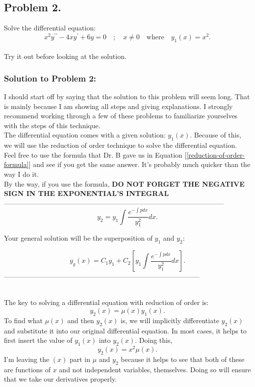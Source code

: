 \documentclass[a4paper,12pt]{article}
\begin{document}
\pagebreak

\subsection*{Problem 2.} Solve the differential equation:
$$ x^2 y^{\prime \prime}-4 x y^{\prime}+6 y=0 \quad ; \quad x\neq0 \quad \text{where} \quad y_1(x) = x^2.$$
\\
 
Try it out before looking at the solution.
\pagebreak
 
 \subsubsection*{Solution to Problem 2:}
 I should start off by saying that the solution to this problem will seem long. That is mainly because I am showing all steps and giving explanations. I strongly recommend working through a few of these problems to familiarize yourselves with the steps of this technique.\\
 
 The differential equation comes with a given solution: $y_1(x).$ Because of this, we will use the reduction of order technique to solve the differential equation.\\
 
 Feel free to use the formula that Dr. B gave us in Equation [\ref{reduction-of-order-formula}] and see if you get the same answer. It's probably much quicker than the way I do it.\\
 
 By the way, if you use the formula, \textbf{DO NOT FORGET THE NEGATIVE SIGN IN THE EXPONENTIAL'S INTEGRAL}\\
 
 ------------------------------------------------------------------------------------------------
$$
 	y_2 = y_1\int{\frac{e^{-\int pdx}}{y_1^2}}dx.
$$
 
 Your general solution will be the superposition of $y_1$ and $y_2$:
 
 \begin{equation}
 	y_g(x) = C_1y_1 + C_2\left[y_1\int{\frac{e^{-\int pdx}}{y_1^2}}dx\right].\label{reduction-of-order-formula}
 \end{equation}
 --------------------------------------------------------------------------------------\\
 \
 
 The key to solving a differential equation with reduction of order is:
 $$ y_2(x) = \mu(x)y_1(x). $$
 To find what $\mu(x)$ and then $y_2(x)$ is, we will implicitly differentiate $y_2(x)$ and substitute it into our original differential equation. In most cases, it helps to first insert the value of $y_1(x)$ into $y_2(x)$. Doing this,
 $$ y_2(x) = x^2\mu(x). $$
 I'm leaving the $(x)$ part in $\mu$ and $y_2$ because it helps to see that both of these are functions of $x$ and not independent variables, themselves. Doing so will ensure that we take our derivatives properly.\\
 
\end{document}
